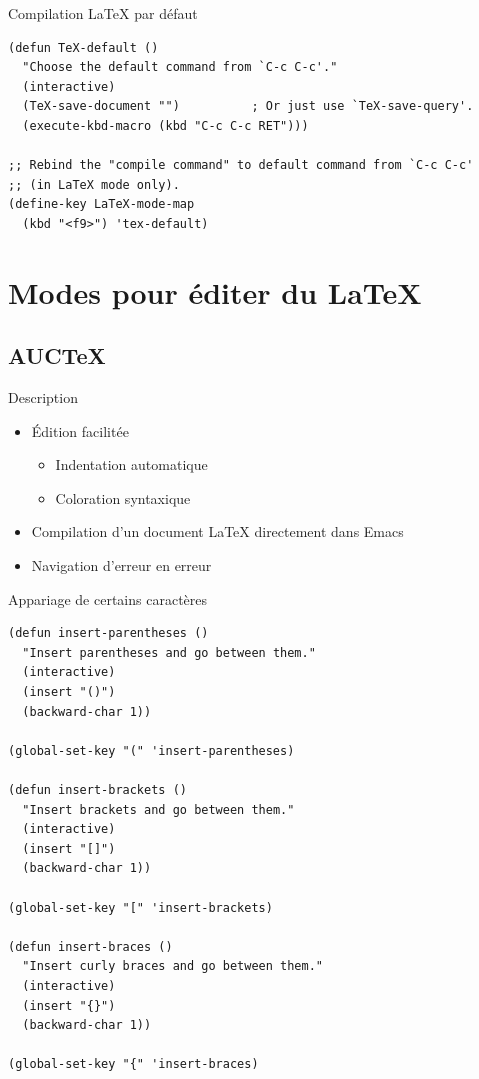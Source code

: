 \documentclass[t]{beamer}
\begin{document}
\begin{frame}[fragile,label={sec:org50824c9}]{Compilation \LaTeX{} par défaut}
 \lstset{language=Lisp,label= ,caption= ,captionpos=b,numbers=none}
\begin{lstlisting}
(defun TeX-default ()
  "Choose the default command from `C-c C-c'."
  (interactive)
  (TeX-save-document "")          ; Or just use `TeX-save-query'.
  (execute-kbd-macro (kbd "C-c C-c RET")))

;; Rebind the "compile command" to default command from `C-c C-c'
;; (in LaTeX mode only).
(define-key LaTeX-mode-map
  (kbd "<f9>") 'tex-default)
\end{lstlisting}
\end{frame}

\section{Modes pour éditer du \LaTeX{}}
\label{sec:orgb6f87d3}

\subsection{AUC\TeX{}}
\label{sec:orga7ad866}

\begin{frame}[label={sec:orgdb7b486}]{Description}
\begin{itemize}
\item Édition facilitée
\begin{itemize}
\item Indentation automatique
\item Coloration syntaxique
\end{itemize}
\item Compilation d'un document \LaTeX{} directement dans Emacs
\item Navigation d'erreur en erreur
\end{itemize}
\end{frame}

\begin{frame}[fragile,label={sec:orgcbcab3e}]{Appariage de certains caractères}
 \lstset{language=Lisp,label= ,caption= ,captionpos=b,numbers=none}
\begin{lstlisting}
(defun insert-parentheses ()
  "Insert parentheses and go between them."
  (interactive)
  (insert "()")
  (backward-char 1))

(global-set-key "(" 'insert-parentheses)

(defun insert-brackets ()
  "Insert brackets and go between them."
  (interactive)
  (insert "[]")
  (backward-char 1))

(global-set-key "[" 'insert-brackets)

(defun insert-braces ()
  "Insert curly braces and go between them."
  (interactive)
  (insert "{}")
  (backward-char 1))

(global-set-key "{" 'insert-braces)
\end{lstlisting}
\end{frame}
\end{document}
